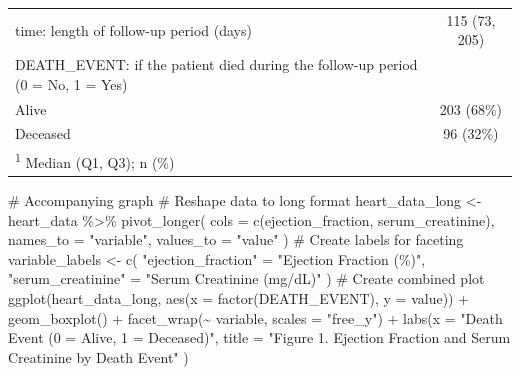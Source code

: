 \documentclass[
  letterpaper,
  DIV=11,
  numbers=noendperiod]{scrartcl}
\newenvironment{Shaded}{\begin{snugshade}}{\end{snugshade}}
\newcommand{\AttributeTok}[1]{\textcolor[rgb]{0.40,0.45,0.13}{#1}}
\newcommand{\CommentTok}[1]{\textcolor[rgb]{0.37,0.37,0.37}{#1}}
\newcommand{\FunctionTok}[1]{\textcolor[rgb]{0.28,0.35,0.67}{#1}}
\newcommand{\NormalTok}[1]{\textcolor[rgb]{0.00,0.23,0.31}{#1}}
\newcommand{\OtherTok}[1]{\textcolor[rgb]{0.00,0.23,0.31}{#1}}
\newcommand{\SpecialCharTok}[1]{\textcolor[rgb]{0.37,0.37,0.37}{#1}}
\newcommand{\StringTok}[1]{\textcolor[rgb]{0.13,0.47,0.30}{#1}}
\begin{document}
\begin{table}
\begin{tabular}[t]{lc}
time: length of follow-up period (days) & 115 (73, 205)\\
DEATH\_EVENT: if the patient died during the follow-up period (0 = No, 1 = Yes) & \\
\hspace{1em}Alive & 203 (68\%)\\
\hspace{1em}Deceased & 96 (32\%)\\
\bottomrule
\multicolumn{2}{l}{\rule{0pt}{1em}\textsuperscript{1} Median (Q1, Q3); n (\%)}\\
\end{tabular}
\end{table}

\begin{Shaded}
\begin{Highlighting}[]
\CommentTok{\# Accompanying graph}
\CommentTok{\# Reshape data to long format}
\NormalTok{heart\_data\_long }\OtherTok{\textless{}{-}}\NormalTok{ heart\_data }\SpecialCharTok{\%\textgreater{}\%}
  \FunctionTok{pivot\_longer}\NormalTok{(}
    \AttributeTok{cols =} \FunctionTok{c}\NormalTok{(ejection\_fraction, serum\_creatinine),}
    \AttributeTok{names\_to =} \StringTok{"variable"}\NormalTok{,}
    \AttributeTok{values\_to =} \StringTok{"value"}
\NormalTok{  )}
\CommentTok{\# Create labels for faceting}
\NormalTok{variable\_labels }\OtherTok{\textless{}{-}} \FunctionTok{c}\NormalTok{(}
  \StringTok{"ejection\_fraction"} \OtherTok{=} \StringTok{"Ejection Fraction (\%)"}\NormalTok{,}
  \StringTok{"serum\_creatinine"} \OtherTok{=} \StringTok{"Serum Creatinine (mg/dL)"}
\NormalTok{)}
\CommentTok{\# Create combined plot}
\FunctionTok{ggplot}\NormalTok{(heart\_data\_long, }\FunctionTok{aes}\NormalTok{(}\AttributeTok{x =} \FunctionTok{factor}\NormalTok{(DEATH\_EVENT), }\AttributeTok{y =}\NormalTok{ value)) }\SpecialCharTok{+}
  \FunctionTok{geom\_boxplot}\NormalTok{() }\SpecialCharTok{+}
  \FunctionTok{facet\_wrap}\NormalTok{(}\SpecialCharTok{\textasciitilde{}}\NormalTok{ variable, }\AttributeTok{scales =} \StringTok{"free\_y"}\NormalTok{) }\SpecialCharTok{+}
  \FunctionTok{labs}\NormalTok{(}\AttributeTok{x =} \StringTok{"Death Event (0 = Alive, 1 = Deceased)"}\NormalTok{,}
       \AttributeTok{title =} \StringTok{"Figure 1. Ejection Fraction and Serum Creatinine by Death Event"}
\NormalTok{  )}
\end{Highlighting}
\end{Shaded}
\end{document}
